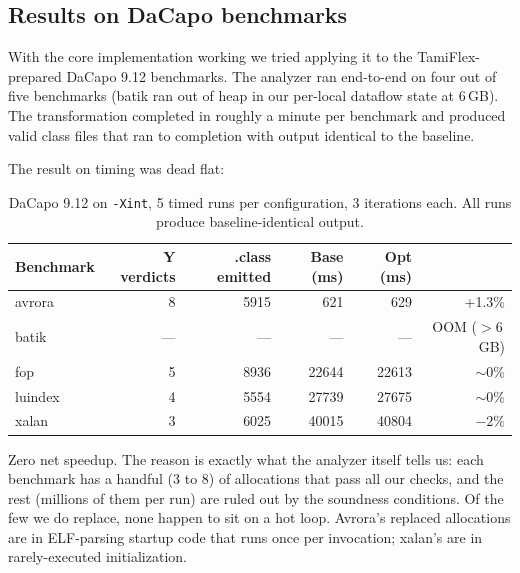 \documentclass[12pt,a4paper]{article}
\begin{document}
 \subsection{Results on DaCapo benchmarks}

 With the core implementation working we tried applying it to the TamiFlex-prepared DaCapo 9.12 benchmarks. The
 analyzer ran end-to-end on four out of five benchmarks (batik ran out of
 heap in our per-local dataflow state at 6\,GB). The transformation completed in roughly a minute per
 benchmark and produced valid class files that ran to completion with
 output identical to the baseline.

 The result on timing was dead flat:

 \begin{table}[h]
 \centering
 \small
 \begin{tabular}{l r r r r r}
 \toprule
 \textbf{Benchmark} & \textbf{Y verdicts} & \textbf{.class emitted} & \textbf{Base (ms)} & \textbf{Opt (ms)} & \textbf{$\
$} \\
 \midrule
 avrora  & 8   & 5915 &    621 &    629 & +1.3\% \\
 batik   & ---  & ---   & ---    & ---    & OOM ($>$6\,GB) \\
 fop     & 5   & 8936 & 22644  & 22613  & $\sim$0\% \\
 luindex & 4   & 5554 & 27739  & 27675  & $\sim$0\% \\
 xalan   & 3   & 6025 & 40015  & 40804  & $-2\%$ \\
 \bottomrule
 \end{tabular}
 \caption{DaCapo 9.12 on \texttt{-Xint}, 5 timed runs per configuration,
 3 iterations each. All runs produce baseline-identical output.}
 \end{table}

 Zero net speedup. The reason is exactly what the analyzer itself tells
 us: each benchmark has a handful (3 to 8) of allocations that pass
 all our checks, and the rest (millions of them per run) are ruled out by
 the soundness conditions. Of the few we do replace, none happen to sit
 on a hot loop. Avrora's replaced allocations are in ELF-parsing startup
 code that runs once per invocation; xalan's are in rarely-executed
 initialization.
\end{document}
